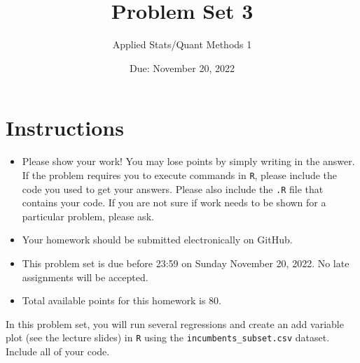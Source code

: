 \documentclass[12pt,letterpaper]{article}
\title{Problem Set 3}
\date{Due: November 20, 2022}
\author{Applied Stats/Quant Methods 1}
\begin{document}
	\maketitle
	\section*{Instructions}
	\begin{itemize}
		\item Please show your work! You may lose points by simply writing in the answer. If the problem requires you to execute commands in \texttt{R}, please include the code you used to get your answers. Please also include the \texttt{.R} file that contains your code. If you are not sure if work needs to be shown for a particular problem, please ask.
	\item Your homework should be submitted electronically on GitHub.
	\item This problem set is due before 23:59 on Sunday November 20, 2022. No late assignments will be accepted.
	\item Total available points for this homework is 80.
	\end{itemize}

		\vspace{.25cm}
	
\noindent In this problem set, you will run several regressions and create an add variable plot (see the lecture slides) in \texttt{R} using the \texttt{incumbents\_subset.csv} dataset. Include all of your code.

	\vspace{.5cm}
\end{document}
